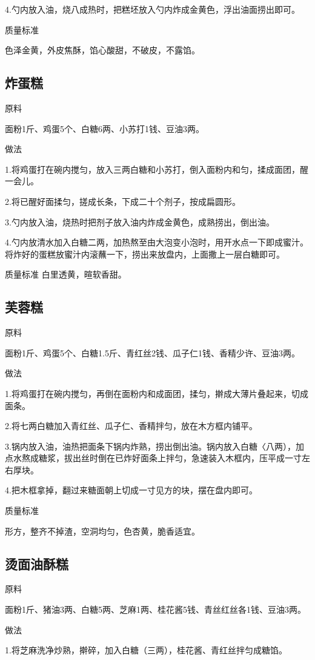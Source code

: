 \documentclass{ctexbook}
\begin{document}
4.勺内放入油，烧八成热时，把糕坯放入勺内炸成金黄色，浮出油面捞出即可。

质量标准

色泽金黄，外皮焦酥，馅心酸甜，不破皮，不露馅。
\subsection{炸蛋糕}
原料

面粉1斤、鸡蛋5个、白糖6两、小苏打1钱、豆油3两。

做法

1.将鸡蛋打在碗内搅匀，放入三两白糖和小苏打，倒入面粉内和匀，揉成面团，醒一会儿。

2.将已醒好面揉匀，搓成长条，下成二十个剂子，按成扁圆形。

3.勺内放入油，烧热时把剂子放入油内炸成金黄色，成熟捞出，倒出油。

4.勺内放清水加入白糖二两，加热熬至由大泡变小泡时，用开水点一下即成蜜汁。将炸好的蛋糕放蜜汁内滚蘸一下，捞出来放盘内，上面撒上一层白糖即可。

质量标准
白里透黄，暄软香甜。
\subsection{芙蓉糕}
原料

面粉1斤、鸡蛋5个、白糖1.5斤、青红丝2钱、瓜子仁1钱、香精少许、豆油3两。

做法

1.将鸡蛋打在碗内搅匀，再倒在面粉内和成面团，揉匀，擀成大薄片叠起来，切成面条。

2.将七两白糖加入青红丝、瓜子仁、香精拌匀，放在木方框内铺平。

3.锅内放入油，油热把面条下锅内炸熟，捞出倒出油。锅内放入白糖〈八两），加点水熬成糖浆，拔出丝时倒在已炸好面条上拌匀，急速装入木框内，压平成一寸左右厚块。

4.把木框拿掉，翻过来糖面朝上切成一寸见方的块，摆在盘内即可。

质量标准

形方，整齐不掉渣，空洞均匀，色杏黄，脆香适宜。
\subsection{烫面油酥糕}
原料

面粉1斤、猪油3两、白糖5两、芝麻1两、桂花酱5钱、青丝红丝各1钱、豆油3两。

做法

1.将芝麻洗净炒熟，擀碎，加入白糖（三两），桂花酱、青红丝拌匀成糖馅。
\end{document}
